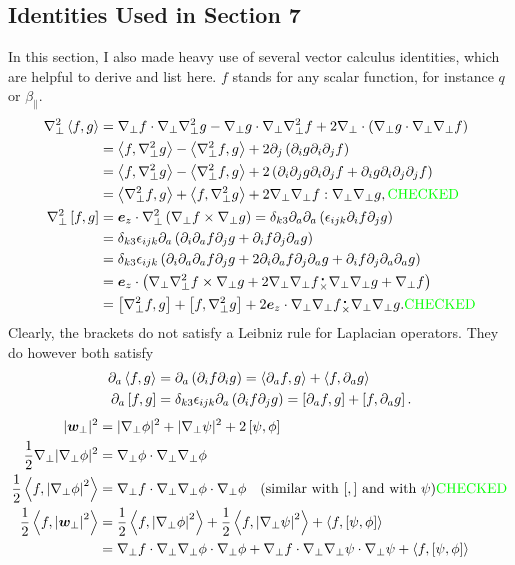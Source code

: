 \documentclass{article}
\newcommand{\para}{\parallel}
\newcommand{\ep}{\epsilon}
\newcommand{\np}{\nabla_\perp}
\newcommand{\p}{\partial}
\newcommand{\pth} [1] {\left( #1 \right) }
\newcommand{\br} [1] {\left[ #1 \right] }
\begin{document}
\subsection{Identities Used in Section 7} In this section, I also made heavy use of several vector calculus identities, which are helpful to derive and list here. $f$ stands for any scalar function, for instance $q$ or $\beta_\para$. 
\begin{align}
    \np^2\Braket{f,g} &= \np f\cdot \np\np^2g - \np g\cdot\np\np^2f + 2\np\cdot\pth{\np g\cdot\np\np f} \\ 
        &= \Braket{f, \np^2g} - \Braket{\np^2f, g} + 2\p_j \pth{\p_ig \p_i\p_jf} \\ 
        &= \Braket{f, \np^2g} - \Braket{\np^2f, g} + 2\pth{\p_i\p_jg \p_i\p_jf + \p_ig \p_i\p_j\p_jf} \\ 
        &= \Braket{\np^2f, g} + \Braket{f, \np^2g} + 2\np\np f:\np\np g, \text{\color{green} CHECKED} \\ 
    \np^2\br{f,g} &= \bm{e}_z\cdot\np^2\pth{\np f\times\np g} = \delta_{k3}\p_a\p_a\pth{\ep_{ijk} \p_if\p_jg} \\ 
        &= \delta_{k3}\ep_{ijk}\p_a \pth{\p_i\p_af \p_jg + \p_if \p_j\p_ag} \\ 
        &= \delta_{k3}\ep_{ijk} \pth{\p_i\p_a\p_af \p_jg + 2\p_i\p_af \p_j\p_ag + \p_if \p_j\p_a\p_ag} \\ 
        &= \bm{e}_z\cdot \pth{\np\np^2f\times\np g + 2\np\np f {}_{\times}^{\,\centerdot} \np\np g + \np f} \\ 
        &= \br{\np^2f, g} + \br{f, \np^2g} + 2\bm{e}_z\cdot \np\np f {}_{\times}^{\,\centerdot} \np\np g.  \text{\color{green} CHECKED} 
\end{align}
Clearly, the brackets do not satisfy a Leibniz rule for Laplacian operators. They do however both satisfy 
\begin{align}
    \p_a\Braket{f,g} &= \p_a\pth{\p_if\p_ig} 
        = \Braket{\p_af,g} + \Braket{f,\p_ag} \\ 
    \p_a\br{f,g} &= \delta_{k3} \ep_{ijk}\p_a\pth{\p_if\p_jg}
        = \br{\p_af,g} + \br{f,\p_ag}. 
\end{align}
\begin{align*}
    |\bm{w}_\perp|^2 &= |\np\phi|^2 + |\np\psi|^2 + 2\br{\psi,\phi} \\ 
    \frac{1}{2}\np|\np\phi|^2 &= \np\phi \cdot\np\np\phi \\ 
    \frac{1}{2} \Braket{f, \left|\np\phi\right|^2} &= \np f\cdot\np\np\phi\cdot\np\phi\quad \text{(similar with $\br{ , }$ and with $\psi$)} \text{\color{green} CHECKED} \\ 
    \frac{1}{2} \Braket{f, \left|\bm{w}_\perp\right|^2} &= \frac{1}{2} \Braket{f, \left|\np\phi\right|^2} + \frac{1}{2} \Braket{f, \left|\np\psi\right|^2} + \Braket{f, \br{\psi,\phi}} \\ 
        &= \np f\cdot\np\np\phi\cdot\np\phi + \np f\cdot\np\np\psi\cdot\np\psi + \Braket{f, \br{\psi,\phi}} 
\end{align*}
\end{document}
